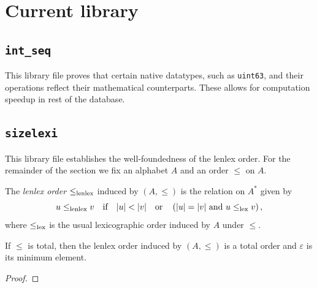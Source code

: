 %

\chapter{Current library}

\section{\texttt{int\_seq}}

This library file proves that certain native datatypes, such as \texttt{uint63}, and their operations
reflect their mathematical counterparts. These allows for computation speedup in rest of the database.

\section{\texttt{sizelexi}}

This library file establishes the well-foundedness of the lenlex order.
For the remainder of the section we fix an alphabet $A$ and an order $\leq$ on $A$.

\begin{definition}%
	\label{def:sizelexi}
	\rocqok{}
	The \emph{lenlex order} $\leq_\textrm{lenlex}$ induced by $(A, \leq)$ is the relation on $A^\ast$ given by
	\[ u \leq_\textrm{lenlex} v \quad \text{if} \quad |u| < |v| \quad \text{or} \quad \left(|u| = |v| \text{ and } u\leq_\textrm{lex} v\right), \]
	where $\leq_\textrm{lex}$ is the usual lexicographic order induced by $A$ under $\leq$.
\end{definition}

\begin{lemma}%
	\label{lem:sizelexi_total_order}
	\rocqok{}
	If $\leq$ is total, then the lenlex order induced by $(A, \leq)$ is a total order and $\varepsilon$ is its minimum
	element.
\end{lemma}
\begin{proof}
	\rocqok{}
\end{proof}

